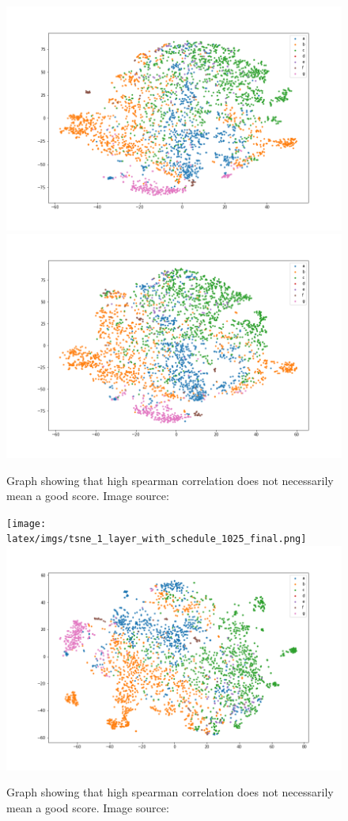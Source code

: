 \begin{figure}[!ht]
  \centering
  \includegraphics[width=0.4\linewidth]{latex/imgs/tsne_1_layer_with_schedule_256_final.png}
  \includegraphics[width=0.4\linewidth]{latex/imgs/tsne_1_layer_with_schedule_256_minloss.png}
  \caption{Graph showing that high spearman correlation does not necessarily mean a good score. Image source:\cite{spearman}}
\end{figure}
\begin{figure}[!ht]
  \centering
  \texttt{[image: latex/imgs/tsne\_1\_layer\_with\_schedule\_1025\_final.png]}
  \includegraphics[width=0.4\linewidth]{latex/imgs/tsne_1_layer_with_schedule_1024_minloss.png}
  \caption{Graph showing that high spearman correlation does not necessarily mean a good score. Image source:\cite{spearman}}
\end{figure}

